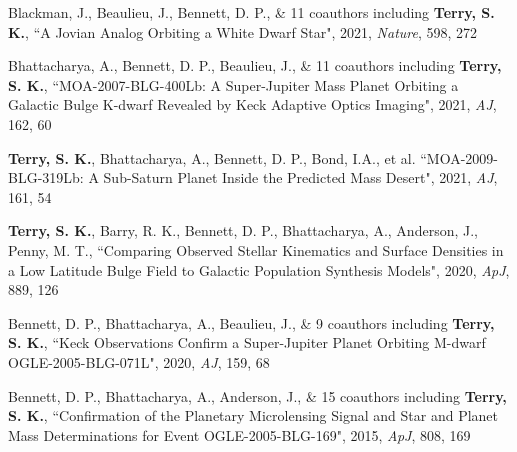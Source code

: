 \documentclass[margin,line]{cv}
\begin{document}
\begin{resume}
\begin{etaremune}
\item Blackman, J., Beaulieu, J., Bennett, D. P., \& 11 coauthors including {\bf Terry, S. K.}, ``A Jovian Analog Orbiting a White Dwarf Star", 2021, \textit{Nature}, 598, 272

\item Bhattacharya, A., Bennett, D. P., Beaulieu, J., \& 11 coauthors including \textbf{Terry, S. K.}, ``MOA-2007-BLG-400Lb: A Super-Jupiter Mass Planet Orbiting a Galactic Bulge K-dwarf Revealed by Keck Adaptive Optics Imaging", 2021, \textit{AJ}, 162, 60


\item \textbf{Terry, S. K.}, Bhattacharya, A., Bennett, D. P., Bond, I.A., et al. ``MOA-2009-BLG-319Lb: A Sub-Saturn Planet Inside the Predicted Mass Desert", 2021, \textit{AJ}, 161, 54

\item {\bf Terry, S. K.}, Barry, R. K., Bennett, D. P., Bhattacharya, A., Anderson, J., Penny, M. T., ``Comparing Observed Stellar Kinematics and Surface Densities in a Low Latitude Bulge Field to Galactic Population Synthesis Models", 2020, \textit{ApJ}, 889, 126

\item Bennett, D. P., Bhattacharya, A., Beaulieu, J., \& 9 coauthors including {\bf Terry, S. K.}, ``Keck Observations Confirm a Super-Jupiter Planet Orbiting M-dwarf OGLE-2005-BLG-071L", 2020, \textit{AJ}, 159, 68


\item Bennett, D. P., Bhattacharya, A., Anderson, J., \& 15 coauthors including {\bf Terry, S. K.}, ``Confirmation of the Planetary Microlensing Signal and Star and Planet Mass Determinations for Event OGLE-2005-BLG-169", 2015, \textit{ApJ}, 808, 169



\end{etaremune}
\end{resume}
\end{document}
